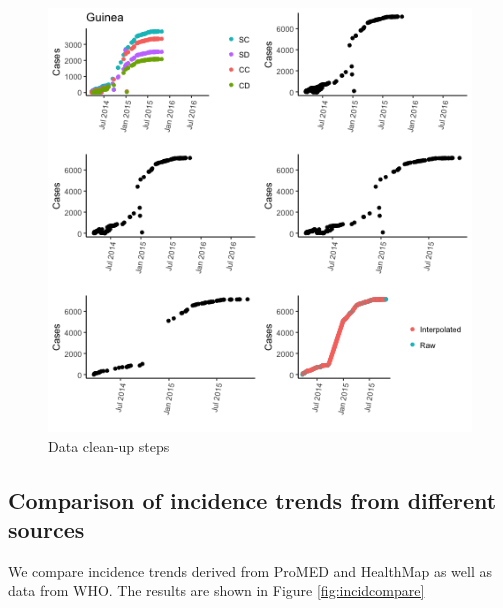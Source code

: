 \documentclass[]{article}
\begin{document}
\begin{figure}

{\centering \includegraphics[width=6.67in]{figures/promed_Guinea} 

}

\caption{Data clean-up steps}\label{fig:hmclean}
\end{figure}

\subsection{Comparison of incidence trends from different
sources}\label{comparison-of-incidence-trends-from-different-sources}

We compare incidence trends derived from ProMED and HealthMap as well as
data from WHO. The results are shown in Figure \ref{fig:incidcompare}
\end{document}
